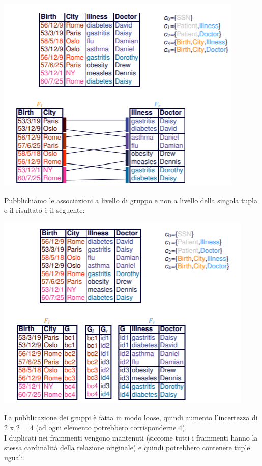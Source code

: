 \begin{center}
    \includegraphics[scale=0.8]{img/groupass1.png}
\end{center}
Pubblichiamo le associazioni a livello di gruppo e non a livello della singola tupla e il risultato è il seguente:
\begin{center}
    \includegraphics[scale=0.8]{img/groupass2.png}
\end{center}
La pubblicazione dei gruppi è fatta in modo loose, quindi aumento l'incertezza di \\ 2 x 2 = 4 (ad ogni elemento potrebbero corrisponderne 4).\\
I duplicati nei frammenti vengono mantenuti (siccome tutti i frammenti hanno la stessa cardinalità della relazione originale) e quindi potrebbero contenere tuple uguali.\\
